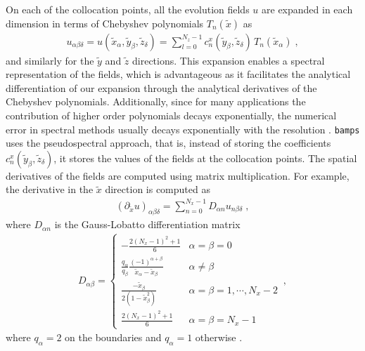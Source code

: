 On each of the collocation points, all the evolution fields $u$ are expanded in each dimension in terms of Chebyshev polynomials $T_n(\tilde{x})$ \cite{Numerical_Relativity_Solving_Einsteins_Equations_on_the_Computer} as
%
\begin{align}
 u_{\alpha \beta \delta} = u(\tilde{x}_\alpha, \tilde{y}_\beta, \tilde{z}_\delta) = \sum_{l=0}^{N_z -1} c^x_n(\tilde{y}_\beta, \tilde{z}_\delta) \, T_n(\tilde{x}_\alpha) \; ,
\end{align}
%
and similarly for the $\tilde{y}$ and $\tilde{z}$ directions. This expansion enables a spectral representation of the fields, which is advantageous as it facilitates the analytical differentiation of our expansion through the analytical derivatives of the Chebyshev polynomials. Additionally, since for many applications the contribution of higher order polynomials decays exponentially, the numerical error in spectral methods usually decays exponentially with the resolution \cite{Numerical_Relativity_Solving_Einsteins_Equations_on_the_Computer}. \texttt{bamps} uses the pseudospectral approach, that is, instead of storing the coefficients $c^x_n(\tilde{y}_\beta, \tilde{z}_\delta)$, it stores the values of the fields at the collocation points. The spatial derivatives of the fields are computed using matrix multiplication. For example, the derivative in the $\tilde{x}$ direction is computed as
%
\begin{align}
    (\partial_{\tilde{x}} u)_{\alpha \beta \delta} = \sum_{n=0}^{N_x -1} D_{\alpha n} u_{n \beta \delta} \; ,
\end{align}
%
where $D_{\alpha n}$ is the Gauss-Lobatto differentiation matrix
%
\begin{align}
    D_{\alpha\beta}=
    \begin{cases}
        -\frac{2(N_x-1)^2+1}{6} & \alpha=\beta=0 \\
        \frac{q_\alpha}{q_\beta}\frac{(-1)^{\alpha+\beta}}{\tilde{x}_\alpha-\tilde{x}_\beta} & \alpha\neq\beta \\
        \frac{-\tilde{x}_\beta}{2(1-\tilde{x}_\beta^2)} & \alpha=\beta=1,\cdots,N_x-2 \\
        \frac{2(N_x-1)^2+1}{6} & \alpha=\beta=N_x-1
    \end{cases} \, ,
\end{align}
%
where $q_\alpha = 2$ on the boundaries and $q_\alpha = 1$ otherwise \cite{Pseudospectral_method_for_gravitational_wave_collapse,Numerical_Relativity_Solving_Einsteins_Equations_on_the_Computer}.

